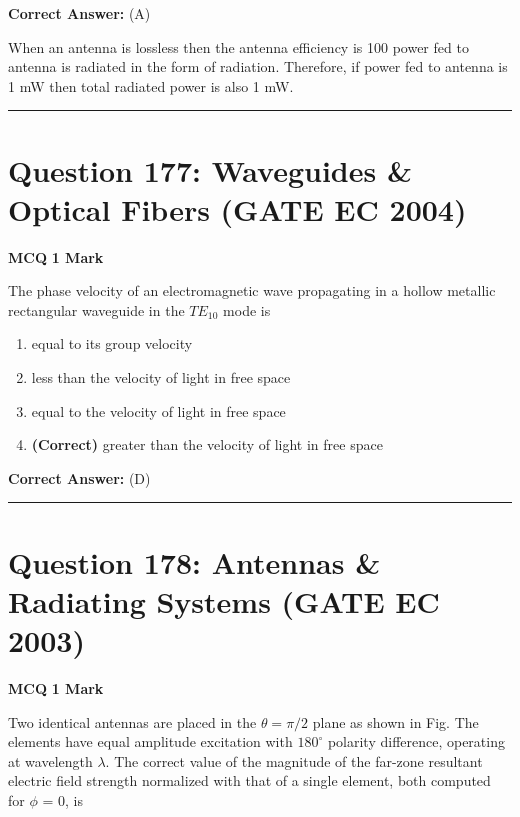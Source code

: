 \documentclass[11pt,a4paper]{article}
\begin{document}
\noindent \textbf{Correct Answer:} (A)

\begin{tcolorbox}[solbox, title=Detailed Solution -- Question 176]
When an antenna is lossless then the antenna
efficiency is 100%
power fed to antenna is radiated in the form of
radiation. Therefore, if power fed to antenna is
1 mW then total radiated power is also 1 mW.
\end{tcolorbox}

\vspace{1.5em}
\hrule
\vspace{1.5em}

\section*{Question 177: Waveguides \& Optical Fibers (GATE EC 2004)}
\noindent \textbf{\color{primary}MCQ} \hfill \textbf{\color{secondary}1 Mark}


\noindent The phase velocity of an electromagnetic wave propagating in a hollow metallic rectangular waveguide in the $TE_{10}$
mode is


\begin{enumerate}[label=(\Alph*)]
    \item equal to its group velocity
    \item less than the velocity of light in free space
    \item equal to the velocity of light in free space
    \item \textbf{(Correct)} greater than the velocity of light in free space
\end{enumerate}

\noindent \textbf{Correct Answer:} (D)


\vspace{1.5em}
\hrule
\vspace{1.5em}

\section*{Question 178: Antennas \& Radiating Systems (GATE EC 2003)}
\noindent \textbf{\color{primary}MCQ} \hfill \textbf{\color{secondary}1 Mark}


\noindent Two identical antennas are placed in the $\theta =\pi /2$ plane as shown in Fig. The elements have equal amplitude excitation with $180^{\circ}$ polarity difference, operating at wavelength $\lambda$. The correct value of the magnitude of the far-zone resultant electric field strength normalized with that of a single element, both computed for $\phi$ = 0, is  
\end{document}
